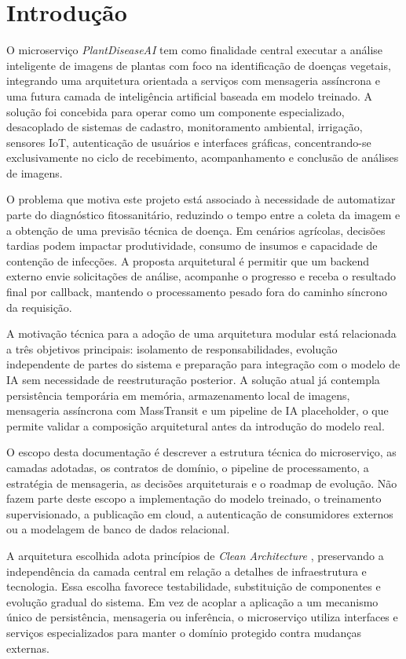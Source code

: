 \chapter{Introdução}

O microserviço \textit{PlantDiseaseAI} tem como finalidade central executar a análise inteligente de imagens de plantas com foco na identificação de doenças vegetais, integrando uma arquitetura orientada a serviços com mensageria assíncrona e uma futura camada de inteligência artificial baseada em modelo treinado. A solução foi concebida para operar como um componente especializado, desacoplado de sistemas de cadastro, monitoramento ambiental, irrigação, sensores IoT, autenticação de usuários e interfaces gráficas, concentrando-se exclusivamente no ciclo de recebimento, acompanhamento e conclusão de análises de imagens.

O problema que motiva este projeto está associado à necessidade de automatizar parte do diagnóstico fitossanitário, reduzindo o tempo entre a coleta da imagem e a obtenção de uma previsão técnica de doença. Em cenários agrícolas, decisões tardias podem impactar produtividade, consumo de insumos e capacidade de contenção de infecções. A proposta arquitetural é permitir que um backend externo envie solicitações de análise, acompanhe o progresso e receba o resultado final por callback, mantendo o processamento pesado fora do caminho síncrono da requisição.

A motivação técnica para a adoção de uma arquitetura modular está relacionada a três objetivos principais: isolamento de responsabilidades, evolução independente de partes do sistema e preparação para integração com o modelo de IA sem necessidade de reestruturação posterior. A solução atual já contempla persistência temporária em memória, armazenamento local de imagens, mensageria assíncrona com MassTransit e um pipeline de IA placeholder, o que permite validar a composição arquitetural antes da introdução do modelo real.

O escopo desta documentação é descrever a estrutura técnica do microserviço, as camadas adotadas, os contratos de domínio, o pipeline de processamento, a estratégia de mensageria, as decisões arquiteturais e o roadmap de evolução. Não fazem parte deste escopo a implementação do modelo treinado, o treinamento supervisionado, a publicação em cloud, a autenticação de consumidores externos ou a modelagem de banco de dados relacional.

A arquitetura escolhida adota princípios de \textit{Clean Architecture} \cite{martin2008clean}, preservando a independência da camada central em relação a detalhes de infraestrutura e tecnologia. Essa escolha favorece testabilidade, substituição de componentes e evolução gradual do sistema. Em vez de acoplar a aplicação a um mecanismo único de persistência, mensageria ou inferência, o microserviço utiliza interfaces e serviços especializados para manter o domínio protegido contra mudanças externas.

